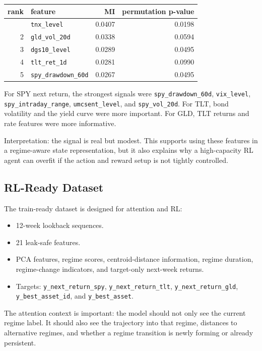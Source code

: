 {\def\LTcaptype{none} %
\begin{longtable}[]{@{}rlrr@{}}
\toprule\noalign{}
rank & feature & MI & permutation p-value \\
\midrule\noalign{}
\endhead
\bottomrule\noalign{}
\endlastfoot
1 & \texttt{tnx\_level} & 0.0407 & 0.0198 \\
2 & \texttt{gld\_vol\_20d} & 0.0338 & 0.0594 \\
3 & \texttt{dgs10\_level} & 0.0289 & 0.0495 \\
4 & \texttt{tlt\_ret\_1d} & 0.0281 & 0.0990 \\
5 & \texttt{spy\_drawdown\_60d} & 0.0267 & 0.0495 \\
\end{longtable}
}

For SPY next return, the strongest signals were
\texttt{spy\_drawdown\_60d}, \texttt{vix\_level},
\texttt{spy\_intraday\_range}, \texttt{umcsent\_level}, and
\texttt{spy\_vol\_20d}. For TLT, bond volatility and the yield curve
were more important. For GLD, TLT returns and rate features were more
informative.

Interpretation: the signal is real but modest. This supports using these
features in a regime-aware state representation, but it also explains
why a high-capacity RL agent can overfit if the action and reward setup
is not tightly controlled.

\subsection{RL-Ready Dataset}\label{rl-ready-dataset}

The train-ready dataset is designed for attention and RL:

\begin{itemize}
\tightlist
\item
  12-week lookback sequences.
\item
  21 leak-safe features.
\item
  PCA features, regime scores, centroid-distance information, regime
  duration, regime-change indicators, and target-only next-week returns.
\item
  Targets: \texttt{y\_next\_return\_spy}, \texttt{y\_next\_return\_tlt},
  \texttt{y\_next\_return\_gld}, \texttt{y\_best\_asset\_id}, and
  \texttt{y\_best\_asset}.
\end{itemize}

The attention context is important: the model should not only see the
current regime label. It should also see the trajectory into that
regime, distances to alternative regimes, and whether a regime
transition is newly forming or already persistent.

